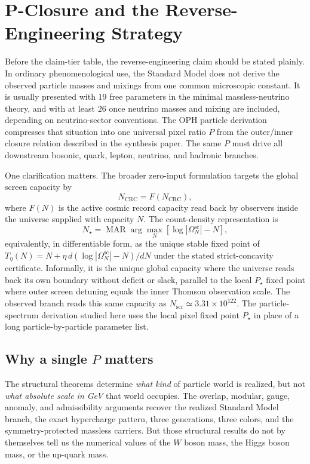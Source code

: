 \documentclass[11pt]{article}
\begin{document}
\section{P-Closure and the Reverse-Engineering Strategy}

Before the claim-tier table, the reverse-engineering claim should be stated plainly. In
ordinary phenomenological use, the Standard Model does not derive the observed particle masses and
mixings from one common microscopic constant. It is usually presented with \(19\) free parameters
in the minimal massless-neutrino theory, and with at least \(26\) once neutrino masses and mixing
are included, depending on neutrino-sector conventions. The OPH particle derivation compresses
that situation into one universal pixel ratio \(P\) from the outer/inner closure relation
described in the synthesis paper. The same \(P\) must drive all
downstream bosonic, quark, lepton, neutrino, and hadronic branches.

One clarification matters. The broader zero-input formulation targets the global screen capacity by
\[
N_{\mathrm{CRC}}=F(N_{\mathrm{CRC}}),
\]
where \(F(N)\) is the active cosmic record capacity read back by observers inside the universe
supplied with capacity \(N\). The count-density representation is
\[
N_\star=\operatorname{MAR}\arg\max_N\left[\log|\Omega^{\mathrm{sc}}_N|-N\right],
\]
equivalently, in differentiable form, as the unique stable fixed point of
\(T_\eta(N)=N+\eta\,d(\log|\Omega^{\mathrm{sc}}_N|-N)/dN\) under the stated strict-concavity
certificate. Informally, it is the unique global capacity where the universe reads back its own
boundary without deficit or slack, parallel to the local \(P_\star\) fixed point where outer screen
detuning equals the inner Thomson observation scale. The observed branch reads this same capacity as
\(N_{\mathrm{scr}}\simeq3.31\times10^{122}\). The
particle-spectrum derivation studied here uses the local pixel fixed point \(P_\star\) in place of
a long particle-by-particle parameter list.

\subsection{Why a single \(P\) matters}

The structural theorems determine \emph{what kind} of particle world is
realized, but not \emph{what absolute scale in GeV} that world occupies. The overlap,
modular, gauge, anomaly, and admissibility arguments recover the realized Standard Model branch,
the exact hypercharge pattern, three generations, three colors, and the symmetry-protected
massless carriers. But those structural results do not by themselves tell us the numerical values
of the \(W\) boson mass, the Higgs boson mass, or the up-quark mass.
\end{document}
